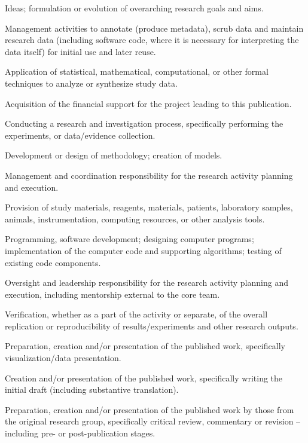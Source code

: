 \documentclass{article}
\begin{document}
\begin{footnotesize}
\begin{description}
\setlength\itemsep{-0.3em}
\item[Conceptualization] Ideas; formulation or evolution of overarching research goals and aims. 
\item[Data Curation] Management activities to annotate (produce metadata), scrub data and maintain research data (including software code, where it is necessary for interpreting the data itself) for initial use and later reuse. 
\item[Formal Analysis] Application of statistical, mathematical, computational, or other formal techniques to analyze or synthesize study data. 
\item[Funding Acquisition] Acquisition of the financial support for the project leading to this publication. 
\item[Investigation] Conducting a research and investigation process, specifically performing the experiments, or data/evidence collection.
\item[Methodology] Development or design of methodology; creation of models.
\item[Project Administration] Management and coordination responsibility for the research activity planning and execution.
\item[Resources] Provision of study materials, reagents, materials, patients, laboratory samples, animals, instrumentation, computing resources, or other analysis tools. 
\item[Software] Programming, software development; designing computer programs; implementation of the computer code and supporting algorithms; testing of existing code components.
\item[Supervision]  Oversight and leadership responsibility for the research activity planning and execution, including mentorship external to the core team. 
\item[Validation] Verification, whether as a part of the activity or separate, of the overall replication or reproducibility of results/experiments and other research outputs.
\item[Visuazlization] Preparation, creation and/or presentation of the published work, specifically visualization/data presentation.
\item[Writing - Original Draft] Creation and/or presentation of the published work, specifically writing the initial draft (including substantive translation).
\item[Writing - Review and Editing]   Preparation, creation and/or presentation of the published work by those from the original research group, specifically critical review, commentary or revision – including pre- or post-publication stages. 
\end{description}
\end{footnotesize}
\end{document}
